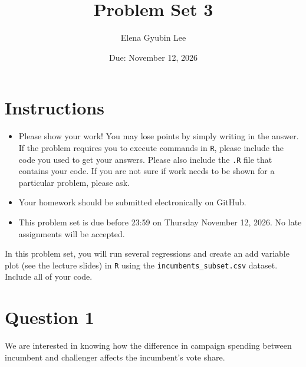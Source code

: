 \documentclass[12pt,letterpaper]{article}
\title{Problem Set 3}
\date{Due: November 12, 2026}
\author{Elena Gyubin Lee}
\begin{document}
	\maketitle
	\section*{Instructions}
	\begin{itemize}
		\item Please show your work! You may lose points by simply writing in the answer. If the problem requires you to execute commands in \texttt{R}, please include the code you used to get your answers. Please also include the \texttt{.R} file that contains your code. If you are not sure if work needs to be shown for a particular problem, please ask.
	\item Your homework should be submitted electronically on GitHub.
	\item This problem set is due before 23:59 on Thursday November 12, 2026. No late assignments will be accepted.

	\end{itemize}

		\vspace{.25cm}
	
\noindent In this problem set, you will run several regressions and create an add variable plot (see the lecture slides) in \texttt{R} using the \texttt{incumbents\_subset.csv} dataset. Include all of your code.

\newpage

\section*{Question 1}
\vspace{.25cm}
\noindent We are interested in knowing how the difference in campaign spending between incumbent and challenger affects the incumbent's vote share. \vspace{.5cm}
\end{document}

